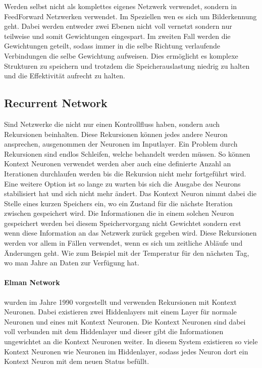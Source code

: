 Werden selbst nicht als komplettes eigenes Netzwerk verwendet, sondern in FeedForward Netzwerken verwendet.
Im Speziellen wen es sich um Bilderkennung geht.
Dabei werden entweder zwei Ebenen nicht voll vernetzt sondern nur teilweise und somit Gewichtungen eingespart.
Im zweiten Fall werden die Gewichtungen geteilt, sodass immer in die selbe Richtung verlaufende Verbindungen die selbe Gewichtung aufweisen.
Dies ermöglicht es komplexe Strukturen zu speichern und trotzdem die Speicherauslastung niedrig zu halten und die Effektivität aufrecht zu halten.


\subsection{Recurrent Network}

Sind Netzwerke die nicht nur einen Kontrollfluss haben, sondern auch Rekursionen beinhalten. 
Diese Rekursionen können jedes andere Neuron ansprechen, ausgenommen der Neuronen im Inputlayer.
Ein Problem durch Rekursionen sind endlos Schleifen, welche behandelt werden müssen.
So können Kontext Neuronen verwendet werden aber auch eine definierte Anzahl an Iterationen durchlaufen werden bis die Rekursion nicht mehr fortgeführt wird. 
Eine weitere Option ist so lange zu warten bis sich die Ausgabe des Neurons stabilisiert hat und sich nicht mehr ändert.
Das Kontext Neuron nimmt dabei die Stelle eines kurzen Speichers ein, wo ein Zustand für die nächste Iteration zwischen gespeichert wird.
Die Informationen die in einem solchen Neuron gespeichert werden bei diesem Speichervorgang nicht Gewichtet sondern erst wenn diese Information an das Netzwerk zurück gegeben wird.
Diese Rekursionen werden vor allem in Fällen verwendet, wenn es sich um zeitliche Abläufe und Änderungen geht. 
Wie zum Beispiel mit der Temperatur für den nächsten Tag, wo man Jahre an Daten zur Verfügung hat.

\paragraph{Elman Network} wurden im Jahre 1990 vorgestellt und verwenden Rekursionen mit Kontext Neuronen. 
Dabei existieren zwei Hiddenlayers mit einem Layer für normale Neuronen und eines mit Kontext Neuronen. 
Die Kontext Neuronen sind dabei voll verbunden mit dem Hiddenlayer und dieser gibt die Informationen ungewichtet an die Kontext Neuronen weiter.
In diesem System existieren so viele Kontext Neuronen wie Neuronen im Hiddenlayer, sodass jedes Neuron dort ein Kontext Neuron mit dem neuen Status befüllt.

